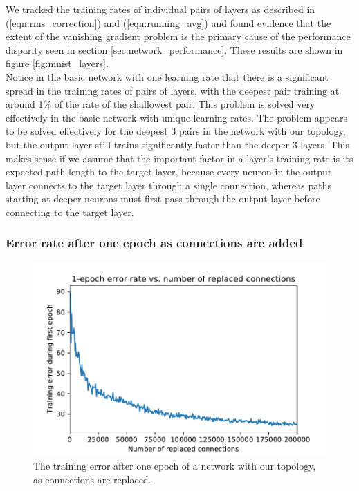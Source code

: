 \documentclass{article}
\newcommand{\npar}{\\\indent}
\begin{document}
We tracked the training rates of individual pairs of layers as described in (\ref{eqn:rms_correction}) and (\ref{eqn:running_avg}) and found evidence that the extent of the vanishing gradient problem is the primary cause of the performance disparity seen in section \ref{sec:network_performance}. These results are shown in figure \ref{fig:mnist_layers}.
\npar
Notice in the basic network with one learning rate that there is a significant spread in the training rates of pairs of layers, with the deepest pair training at around 1\% of the rate of the shallowest pair. This problem is solved very effectively in the basic network with unique learning rates. The problem appears to be solved effectively for the deepest 3 pairs in the network with our topology, but the output layer still trains significantly faster than the deeper 3 layers. This makes sense if we assume that the important factor in a layer's training rate is its expected path length to the target layer, because every neuron in the output layer connects to the target layer through a single connection, whereas paths starting at deeper neurons must first pass through the output layer before connecting to the target layer.

\subsubsection{Error rate after one epoch as connections are added}
\label{sec:mnist_1epoch}

\begin{figure}
  \centering
  \includegraphics[width=\textwidth]{figures/MNIST_linear_sweep_error_vs_replaced_conns.pdf}
  \caption{The training error after one epoch of a network with our topology, as connections are replaced.}
  \label{fig:mnist_1epoch}
\end{figure}
\end{document}
